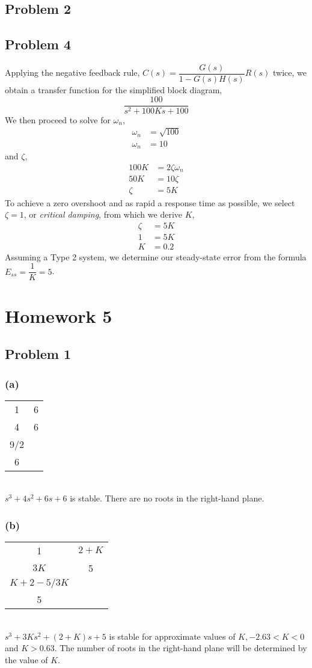 \documentclass[letterpaper,10pt]{article}
\begin{document}
\subsection*{Problem 2}

\subsection*{Problem 4}
Applying the negative feedback rule, $C(s) = \dfrac{G(s)}{1-G(s)H(s)}R(s)$ twice, we obtain a transfer function for the simplified block diagram, \[ \dfrac{100}{s^2 + 100Ks + 100}\]  We then proceed to solve for $\omega_{n}$,
\begin{align*}
	\omega_{n} &= \sqrt{100} \\
	\omega_{n} &= 10 
\end{align*}
and $\zeta$,
\begin{align*}
	100K &= 2\zeta\omega_{n} \\
	50K &= 10\zeta \\
	\zeta &= 5K
\end{align*}
To achieve a zero overshoot and as rapid a response time as possible, we select $\zeta = 1$, or \emph{critical damping}, from which we derive $K$,
\begin{align*}
	\zeta &= 5K \\
	1 &= 5K \\
	K &= 0.2 
\end{align*}
Assuming a Type 2 system, we determine our steady-state error from the formula  $E_{ss} = \dfrac{1}{K} = 5$.

\section*{Homework 5}
\subsection*{Problem 1}
\subsubsection*{(a)}
\begin{tabular}{cc}
	1&6\\
	4&6\\
	9/2&\\
	6&
\end{tabular}\\
$s^3+4s^2+6s+6$ is stable.  There are no roots in the right-hand plane.
\subsubsection*{(b)}
\begin{tabular}{cc}
	1&$2+K$\\
	$3K$&5\\
	$K+2-5/3K$&\\
	5&
\end{tabular}\\
$s^3+3Ks^2+(2+K)s+5$ is stable for approximate values of $K, -2.63 < K < 0$ and $K > 0.63$.  The number of roots in the right-hand plane will be determined by the value of $K$.
\end{document}

